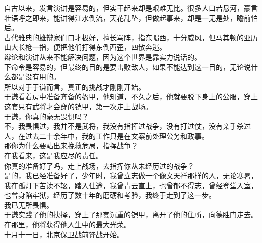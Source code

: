 \begin{multicols}{\theparacolNo}
自古以来，发言演讲是容易的，但实干起来却是艰难无比。很多人口若悬河，豪言壮语呼之即来，能讲得江水倒流，天花乱坠，但做起事来，却是一无是处，瞻前怕后。\\

古代雅典的雄辩家们口才极好，擅长骂阵，指东喝西，十分威风，但马其顿的亚历山大长枪一指，便把他们打得东倒西歪，四散奔逃。\\

辩论和演讲从来不能解决问题，因为这个世界是靠实力说话的。\\

下命令是容易的，但最终的目的是要击败敌人，如果不能达到这一目的，无论说什么都是没有用的。\\

所以对于于谦而言，真正的挑战才刚刚开始。\\

于谦看着房中准备齐备的盔甲，他知道，不久之后，他就要脱下身上的公服，穿上这套只有武将才会穿的铠甲，第一次走上战场。\\

于谦，你真的毫无畏惧吗？\\

不，我畏惧过，我并不是武将，我没有指挥过战争，没有打过仗，没有亲手杀过人，在过去二十余年中，我的工作只是在文案前处理公务和政事。\\

那你为什么要站出来挽救危局，指挥战争？\\

在我看来，这是我应尽的责任。\\

你真的准备好了吗，走上战场，去指挥你从未经历过的战争？\\

是的，我已经准备好了，少年时，我曾立志做一个像文天祥那样的人，无论寒暑，我在孤灯下苦读不辍，踏入仕途，我曾青云直上，也曾郁不得志，曾经登堂入室，也曾身陷牢狱，经历了数十年的磨砺和考验，我终于走到了这一步。\\

我已无所畏惧。\\

于谦实践了他的抉择，穿上了那套沉重的铠甲，离开了他的住所，向德胜门走去。\\

在那里，他将获得他人生中的最大光荣。\\

十月十一日，北京保卫战前锋战开始。\\
\ifnum{}
	\end{multicols}
\fi
\newpage
